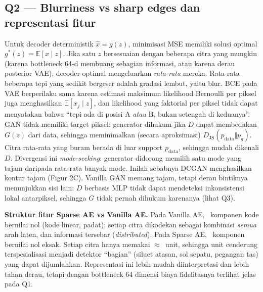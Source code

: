 \subsection*{Q2 --- Blurriness vs sharp edges dan representasi fitur}
Untuk decoder deterministik $\hat{x}=g(z)$, minimisasi MSE memiliki solusi optimal $g^*(z)=\mathbb{E}[x\mid z]$.
Jika satu $z$ bersesuaian dengan beberapa citra yang mungkin (karena bottleneck 64-d membuang sebagian informasi, atau karena
derau posterior VAE), decoder optimal mengeluarkan \emph{rata-rata} mereka. Rata-rata beberapa tepi yang sedikit bergeser
adalah gradasi lembut, yaitu blur. BCE pada VAE berperilaku sama karena estimasi maksimum likelihood Bernoulli per piksel
juga menghasilkan $\mathbb{E}[x_j\mid z]$, dan likelihood yang faktorial per piksel tidak dapat menyatakan bahwa ``tepi ada di
posisi A \emph{atau} B, bukan setengah di keduanya''. GAN tidak memiliki target piksel: generator dihukum jika $D$ dapat
membedakan $G(z)$ dari data, sehingga meminimalkan (secara aproksimasi) $D_{\text{JS}}(p_{\text{data}}\Vert p_g)$. Citra rata-rata
yang buram berada di luar support $p_{\text{data}}$, sehingga mudah dikenali $D$. Divergensi ini \emph{mode-seeking}: generator
didorong memilih satu mode yang tajam daripada rata-rata banyak mode. Inilah sebabnya DCGAN menghasilkan kontur tajam
(Figur 2C). Vanilla GAN memang tajam, tetapi derau bintiknya menunjukkan sisi lain: $D$ berbasis MLP tidak
dapat mendeteksi inkonsistensi lokal antarpiksel, sehingga $G$ tidak pernah dihukum karenanya (lihat Q3).

\textbf{Struktur fitur Sparse AE vs Vanilla AE.} Pada Vanilla AE, \ZFAE\ komponen kode bernilai nol (kode linear, padat):
setiap citra dikodekan sebagai kombinasi \emph{semua} arah laten, dan informasi tersebar (\emph{distributed}). Pada Sparse AE,
\ZFSAE\ komponen bernilai nol eksak. Setiap citra hanya memakai $\approx$\ACTSAE\ unit, sehingga unit cenderung terspesialisasi
menjadi detektor ``bagian'' (siluet atasan, sol sepatu, pegangan tas) yang dapat dijumlahkan. Representasi ini lebih mudah
diinterpretasi dan lebih tahan derau, tetapi dengan bottleneck 64 dimensi biaya fidelitasnya terlihat jelas pada Q1.

